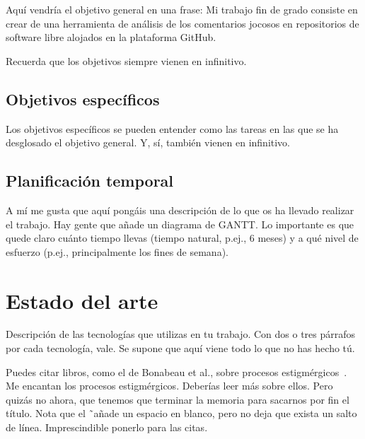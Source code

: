 \documentclass[a4paper, 12pt]{book}
\begin{document}
Aquí vendría el objetivo general en una frase:
Mi trabajo fin de grado consiste en crear de una herramienta de análisis de los comentarios jocosos en repositorios de software libre alojados en la plataforma GitHub.

Recuerda que los objetivos siempre vienen en infinitivo.


\section{Objetivos específicos}
\label{sec:objetivos-especificos}

Los objetivos específicos se pueden entender como las tareas en las que se ha desglosado el objetivo general.
Y, sí, también vienen en infinitivo.


\section{Planificación temporal}
\label{sec:planificacion-temporal}

A mí me gusta que aquí pongáis una descripción de lo que os ha llevado realizar el trabajo.
Hay gente que añade un diagrama de GANTT.
Lo importante es que quede claro cuánto tiempo llevas (tiempo natural, p.ej., 6 meses) y a qué nivel de esfuerzo (p.ej., principalmente los fines de semana).



\cleardoublepage
\chapter{Estado del arte}
\label{chap:estado}

Descripción de las tecnologías que utilizas en tu trabajo. 
Con dos o tres párrafos por cada tecnología, vale. 
Se supone que aquí viene todo lo que no has hecho tú.

Puedes citar libros, como el de Bonabeau et al., sobre procesos estigmérgicos~\cite{bonabeau:_swarm}. 
Me encantan los procesos estigmérgicos.
Deberías leer más sobre ellos.
Pero quizás no ahora, que tenemos que terminar la memoria para sacarnos por fin el título.
Nota que el \~ \ añade un espacio en blanco, pero no deja que exista un salto de línea. 
Imprescindible ponerlo para las citas.
\end{document}
